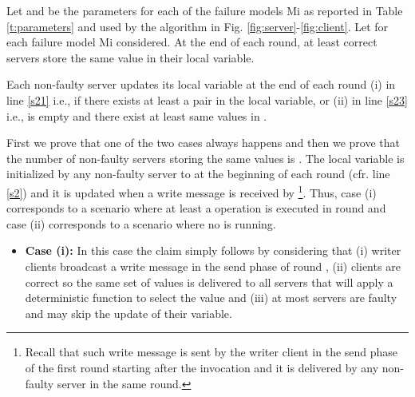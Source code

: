 




\begin{lemma}\label{l:consistencyEndGBS}



Let  and  be the parameters for each of the  failure models Mi as reported in Table \ref{t:parameters} and used by the algorithm in Fig. \ref{fig:server}-\ref{fig:client}.
Let  for each failure model Mi considered. 
At the end of each round, at least  correct servers store the same value  in their  local variable.
\end{lemma}

\begin{proofL}
Each non-faulty server updates its  local variable at the end of each round  (i) in line  \ref{s21} i.e., if there exists at least a pair in the  local variable, or (ii) in line  \ref{s23} i.e.,  is empty and there exist at least  same values in .


First we prove that one of the two cases always happens and then we prove that the number of non-faulty servers storing the same values  is .
The  local variable is initialized by any non-faulty server  to  at the beginning of each round  (cfr. line \ref{s2}) and it is updated when a {\sc write} message is received by \footnote{Recall that such {\sc write} message is sent by the writer client in the send phase of the first round starting after the  invocation and it is delivered by any non-faulty server in the same round.}.
Thus, case (i) corresponds to a scenario where at least a  operation is executed in round  and case (ii) corresponds to a scenario where no  is running.

\begin{itemize}
\item {\bf Case (i):}  In this case the claim simply follows by considering that (i) writer clients broadcast a {\sc write} message in the send phase of round , (ii) clients are correct so the same set of values is delivered to all servers that will apply a deterministic function to select the value  and (iii) at most  servers are faulty and may skip the update of their  variable.\\


\end{itemize}
\end{proofL}
